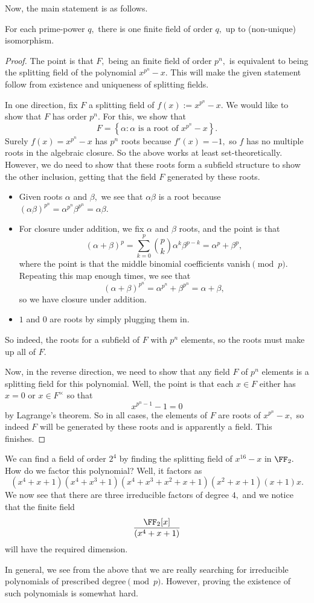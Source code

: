 \documentclass[../notes.tex]{subfiles}
\begin{document}
Now, the main statement is as follows.
\begin{theorem}
	For each prime-power $q,$ there is one finite field of order $q,$ up to (non-unique) isomorphism.
\end{theorem}
\begin{proof}
	The point is that $F,$ being an finite field of order $p^n,$ is equivalent to being the splitting field of the polynomial $x^{p^n}-x.$ This will make the given statement follow from existence and uniqueness of splitting fields.

	In one direction, fix $F$ a splitting field of $f(x):=x^{p^n}-x.$ We would like to show that $F$ has order $p^n.$ For this, we show that
	\[F=\left\{\alpha:\alpha\text{ is a root of }x^{p^n}-x\right\}.\]
	Surely $f(x)=x^{p^n}-x$ has $p^n$ roots because $f'(x)=-1,$ so $f$ has no multiple roots in the algebraic closure. So the above works at least set-theoretically. However, we do need to show that these roots form a subfield structure to show the other inclusion, getting that the field $F$ generated by these roots.
	\begin{itemize}
		\item Given roots $\alpha$ and $\beta,$ we see that $\alpha\beta$ is a root because $(\alpha\beta)^{p^n}=\alpha^{p^n}\beta^{p^n}=\alpha\beta.$
		\item For closure under addition, we fix $\alpha$ and $\beta$ roots, and the point is that
		\[(\alpha+\beta)^p=\sum_{k=0}^p\binom pk\alpha^k\beta^{p-k}=\alpha^p+\beta^p,\]
		where the point is that the middle binomial coefficients vanish$\pmod p.$ Repeating this map enough times, we see that
		\[(\alpha+\beta)^{p^n}=\alpha^{p^n}+\beta^{p^n}=\alpha+\beta,\]
		so we have closure under addition.
		\item $1$ and $0$ are roots by simply plugging them in.
	\end{itemize}
	So indeed, the roots for a subfield of $F$ with $p^n$ elements, so the roots must make up all of $F.$

	Now, in the reverse direction, we need to show that any field $F$ of $p^n$ elements is a splitting field for this polynomial. Well, the point is that each $x\in F$ either has $x=0$ or $x\in F^\times$ so that
	\[x^{p^n-1}-1=0\]
	by Lagrange's theorem. So in all cases, the elements of $F$ are roots of $x^{p^n}-x,$ so indeed $F$ will be generated by these roots and is apparently a field. This finishes.
\end{proof}
\begin{ex}
	We can find a field of order $2^4$ by finding the splitting field of $x^{16}-x$ in $\FF_2.$ How do we factor this polynomial? Well, it factors as
	\[\left(x^4+x+1\right)\left(x^4+x^3+1\right)\left(x^4+x^3+x^2+x+1\right)\left(x^2+x+1\right)\left(x+1\right)x.\]
	We now see that there are three irreducible factors of degree $4,$ and we notice that the finite field
	\[\frac{\FF_2[x]}{\left(x^4+x+1\right)}\]
	will have the required dimension.
\end{ex}
In general, we see from the above that we are really searching for irreducible polynomials of prescribed degree$\pmod p.$ However, proving the existence of such polynomials is somewhat hard.
\end{document}
